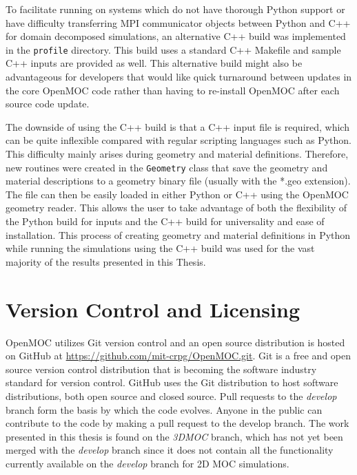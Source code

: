 To facilitate running on systems which do not have thorough Python support or have difficulty transferring MPI communicator objects between Python and C++ for domain decomposed simulations, an alternative C++ build was implemented in the \texttt{profile} directory. This build uses a standard C++ Makefile and sample C++ inputs are provided as well. This alternative build might also be advantageous for developers that would like quick turnaround between updates in the core OpenMOC code rather than having to re-install OpenMOC after each source code update. 

The downside of using the C++ build is that a C++ input file is required, which can be quite inflexible compared with regular scripting languages such as Python. This difficulty mainly arises during geometry and material definitions. Therefore, new routines were created in the \texttt{Geometry} class that save the geometry and material descriptions to a geometry binary file (usually with the *.geo extension). The file can then be easily loaded in either Python or C++ using the OpenMOC geometry reader. This allows the user to take advantage of both the flexibility of the Python build for inputs and the C++ build for universality and ease of installation. This process of creating geometry and material definitions in Python while running the simulations using the C++ build was used for the vast majority of the results presented in this Thesis.



\section{Version Control and Licensing}
\label{sec:version-control}

OpenMOC utilizes Git version control and an open source distribution is hosted on GitHub at \url{https://github.com/mit-crpg/OpenMOC.git}. Git is a free and open source version control distribution that is becoming the software industry standard for version control. GitHub uses the Git distribution to host software distributions, both open source and closed source. Pull requests to the \textit{develop} branch form the basis by which the code evolves. Anyone in the public can contribute to the code by making a pull request to the develop branch. The work presented in this thesis is found on the \textit{3DMOC} branch, which has not yet been merged with the \textit{develop} branch since it does not contain all the functionality currently available on the \textit{develop} branch for 2D \ac{MOC} simulations.

